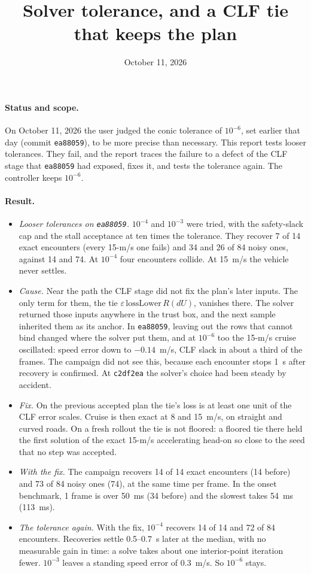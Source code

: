 \documentclass[11pt]{article}
\title{Solver tolerance, and a CLF tie that keeps the plan}
\author{}
\date{October 11, 2026}
\begin{document}
\maketitle
\paragraph{Status and scope.}
On October 11, 2026 the user judged the conic tolerance of $10^{-6}$, set
earlier that day (commit \texttt{ea88059}), to be more precise than
necessary. This report tests looser tolerances. They fail, and the report
traces the failure to a defect of the CLF stage that \texttt{ea88059} had
exposed, fixes it, and tests the tolerance again. The controller keeps
$10^{-6}$.

\paragraph{Result.}
\begin{itemize}
\item \emph{Looser tolerances on \texttt{ea88059}.} $10^{-4}$ and $10^{-3}$
  were tried, with the safety-slack cap and the stall acceptance at ten times
  the tolerance. They recover 7 of 14 exact encounters (every 15-m/s one
  fails) and 34 and 26 of 84 noisy ones, against 14 and 74. At $10^{-4}$
  four encounters collide. At 15~m/s the vehicle never settles.
\item \emph{Cause.} Near the path the CLF stage did not fix the plan's later
  inputs. The only term for them, the tie
  $\varepsilon\,\mathrm{lossLower}\,R(dU)$, vanishes there. The solver
  returned those inputs anywhere in the trust box, and the next sample
  inherited them as its anchor. In \texttt{ea88059}, leaving out the rows
  that cannot bind changed where the solver put them, and at $10^{-6}$ too
  the 15-m/s cruise oscillated: speed error down to $-0.14$~m/s, CLF slack
  in about a third of the frames. The campaign did not see this, because
  each encounter stops 1~s after recovery is confirmed. At
  \texttt{c2df2ea} the solver's choice had been steady by accident.
\item \emph{Fix.} On the previous accepted plan the tie's loss is at least
  one unit of the CLF error scales. Cruise is then exact at 8 and 15~m/s,
  on straight and curved roads. On a fresh rollout the tie is not floored:
  a floored tie there held the first solution of the exact 15-m/s
  accelerating head-on so close to the seed that no step was accepted.
\item \emph{With the fix.} The campaign recovers 14 of 14 exact
  encounters (14 before) and 73 of 84 noisy ones (74), at the same time per
  frame. In the onset benchmark, 1 frame is over 50~ms (34 before) and the
  slowest takes 54~ms (113~ms).
\item \emph{The tolerance again.} With the fix, $10^{-4}$ recovers 14 of
  14 and 72 of 84 encounters. Recoveries settle 0.5--0.7~s later at the
  median, with no measurable gain in time: a solve takes about one
  interior-point iteration fewer. $10^{-3}$ leaves a standing speed error of
  0.3~m/s. So $10^{-6}$ stays.
\end{itemize}
\end{document}
